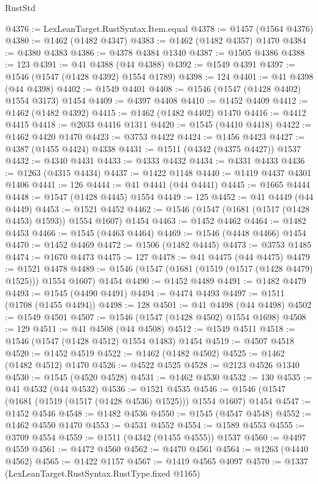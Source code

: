 \begin{lexlean}{RustStd}
\begin{coremodule}
@4376 := LexLeanTarget.RustSyntax.Item.equal
@4378 := @1457 (@1564 @4376)
@4380 := @1462 (@1482 @4347)
@4383 := @1462 (@1482 @4357) @1470
@4384 := @4380 @4383
@4386 := @4378 @4384 @1340
@4387 := @1505 @4386
@4388 := 123
@4391 := @41 @4388 (@44 @4388)
@4392 := @1549 @4391
@4397 := @1546 (@1547 (@1428 @4392) @1554 @1789)
@4398 := 124
@4401 := @41 @4398 (@44 @4398)
@4402 := @1549 @4401
@4408 := @1546 (@1547 (@1428 @4402) @1554 @3173) @1454
@4409 := @4397 @4408
@4410 := @1452 @4409
@4412 := @1462 (@1482 @4392)
@4415 := @1462 (@1482 @4402) @1470
@4416 := @4412 @4415
@4418 := @2033 @4416 @1311
@4420 := @1545 (@4410 @4418)
@4422 := @1462 @4420 @1470
@4423 := @3753 @4422
@4424 := @1456 @4423
@4427 := @4387 (@1455 @4424) @4338
@4431 := @1511 (@4342 (@4375 @4427)) @1537
@4432 := @4340 @4431
@4433 := @4333 @4432
@4434 := @4331 @4433
@4436 := @1263 (@4315 @4434)
@4437 := @1422 @1148
@4440 := @1419 @4437 @4301 @1406
@4441 := 126
@4444 := @41 @4441 (@44 @4441)
@4445 := @1665 @4444
@4448 := @1547 (@1428 @4445) @1554
@4449 := 125
@4452 := @41 @4449 (@44 @4449)
@4453 := @1521 @4452
@4462 := @1546 (@1547 (@1681 (@1517 (@1428 @4453) @1593)) @1554 @1607) @1454
@4463 := @1452 @4462
@4464 := @1482 @4453
@4466 := @1545 (@4463 @4464)
@4469 := @1546 (@4448 @4466) @1454
@4470 := @1452 @4469
@4472 := @1506 (@1482 @4445)
@4473 := @3753 @1485
@4474 := @1670 @4473
@4475 := 127
@4478 := @41 @4475 (@44 @4475)
@4479 := @1521 @4478
@4489 := @1546 (@1547 (@1681 (@1519 (@1517 (@1428 @4479) @1525))) @1554 @1607) @1454
@4490 := @1452 @4489
@4491 := @1482 @4479
@4493 := @1545 (@4490 @4491)
@4494 := @4474 @4493
@4497 := @1511 (@1708 (@1455 @4494))
@4498 := 128
@4501 := @41 @4498 (@44 @4498)
@4502 := @1549 @4501
@4507 := @1546 (@1547 (@1428 @4502) @1554 @1698)
@4508 := 129
@4511 := @41 @4508 (@44 @4508)
@4512 := @1549 @4511
@4518 := @1546 (@1547 (@1428 @4512) @1554 @1483) @1454
@4519 := @4507 @4518
@4520 := @1452 @4519
@4522 := @1462 (@1482 @4502)
@4525 := @1462 (@1482 @4512) @1470
@4526 := @4522 @4525
@4528 := @2123 @4526 @1340
@4530 := @1545 (@4520 @4528)
@4531 := @1462 @4530
@4532 := 130
@4535 := @41 @4532 (@44 @4532)
@4536 := @1521 @4535
@4546 := @1546 (@1547 (@1681 (@1519 (@1517 (@1428 @4536) @1525))) @1554 @1607) @1454
@4547 := @1452 @4546
@4548 := @1482 @4536
@4550 := @1545 (@4547 @4548)
@4552 := @1462 @4550 @1470
@4553 := @4531 @4552
@4554 := @1589 @4553
@4555 := @3709 @4554
@4559 := @1511 (@4342 (@1455 @4555)) @1537
@4560 := @4497 @4559
@4561 := @4472 @4560
@4562 := @4470 @4561
@4564 := @1263 (@4440 @4562)
@4565 := @1422 @1157
@4567 := @1419 @4565 @4097
@4570 := @1337 (LexLeanTarget.RustSyntax.RustType.fixed @1165)

\end{coremodule}
\end{lexlean}
